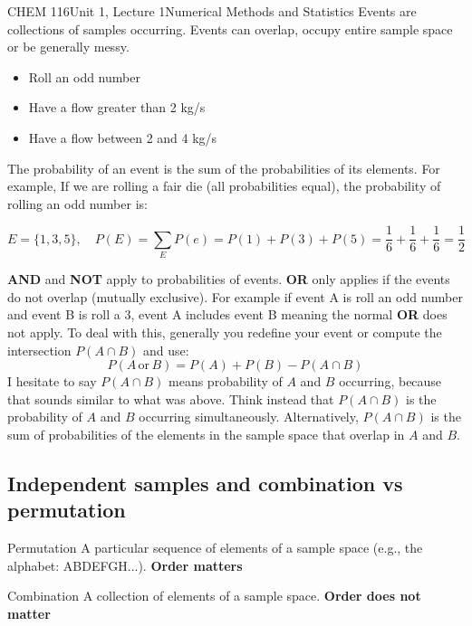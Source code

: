 \documentclass{article}
\begin{document}
\begin{tdoc}{CHEM 116}{Unit 1, Lecture 1}{Numerical Methods and Statistics}
Events are collections of samples occurring. Events can overlap, occupy
entire sample space or be generally messy.

\begin{itemize}

\item Roll an odd number
\item Have a flow greater than 2 kg/s
\item Have a flow between 2 and 4 kg/s

\end{itemize}

The probability of an event is the sum of the probabilities of its elements. For example,
If we are rolling a fair die (all probabilities equal), the probability of rolling an odd number is:


\begin{equation}
  E = \{1, 3, 5\}, \quad P(E) = \sum_E P(e) = P(1) + P(3) + P(5) = \frac{1}{6}  + \frac{1}{6} + \frac{1}{6} = \frac{1}{2}
\end{equation}
\vspace{0.5cm}

{\bf AND} and {\bf NOT} apply to probabilities of events. {\bf OR}
only applies if the events do not overlap (mutually exclusive). For
example if event A is roll an odd number and event B is roll a 3,
event A includes event B meaning the normal {\bf OR} does not
apply. To deal with this, generally you redefine your event or
compute the intersection $P(A\cap B)$ and use:
\begin{equation}
P(A\,\textrm{or}\,B) = P(A) + P(B) - P(A \cap B)
\end{equation}
I hesitate to say $P(A \cap B)$ means probability of $A$ and $B$
occurring, because that sounds similar to what was above. Think
instead that $P(A \cap B)$ is the probability of $A$ and $B$ occurring
simultaneously. Alternatively, $P(A \cap B)$ is the sum of
probabilities of the elements in the sample space that overlap in $A$
and $B$.

\subsection{Independent samples and combination vs permutation}

\begin{description}
  \item{Permutation} A particular sequence of elements of a sample space (e.g., the alphabet: ABDEFGH...).  \textbf{Order matters}
  \item{Combination} A collection of elements of a sample space. \textbf{Order does not matter}
\end{description}


\end{tdoc}
\end{document}
